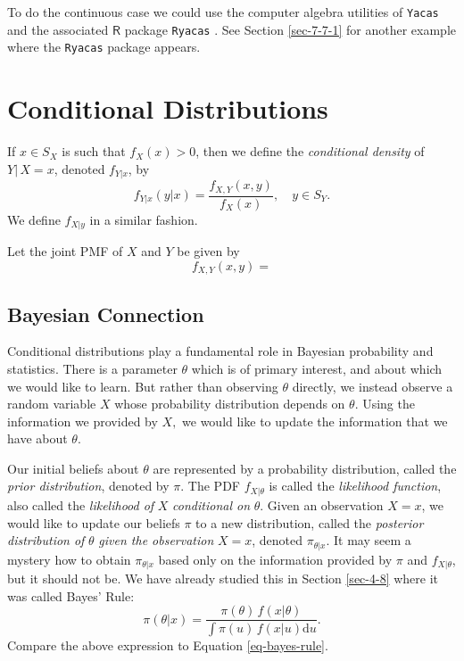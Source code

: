 To do the continuous case we could use the computer algebra utilities
of \texttt{Yacas} and the associated \(\mathsf{R}\) package \texttt{Ryacas}
\cite{Ryacas}. See Section \ref{sec-7-7-1} for another example
where the \texttt{Ryacas} package appears.

\section{Conditional Distributions}
\label{sec-7-3}

If \(x\in S_{X}\) is such that \(f_{X}(x)>0\), then we define the
\emph{conditional density} of \(Y|\, X=x\), denoted \(f_{Y|x}\), by
\begin{equation}
f_{Y|x}(y|x)=\frac{f_{X,Y}(x,y)}{f_{X}(x)},\quad y\in S_{Y}.
\end{equation}
We define \(f_{X|y}\) in a similar fashion.


Let the joint PMF of \(X\) and \(Y\) be given by
\[
f_{X,Y}(x,y) =
\]

\subsection{Bayesian Connection}
\label{sec-7-3-1}

Conditional distributions play a fundamental role in Bayesian
probability and statistics. There is a parameter \(\theta\) which is
of primary interest, and about which we would like to learn. But
rather than observing \(\theta\) directly, we instead observe a random
variable \(X\) whose probability distribution depends on
\(\theta\). Using the information we provided by \(X,\) we would like
to update the information that we have about \(\theta\).

Our initial beliefs about \(\theta\) are represented by a probability
distribution, called the \emph{prior distribution}, denoted by \(\pi\). The
PDF \(f_{X|\theta}\) is called the \emph{likelihood function}, also called
the \emph{likelihood of} \(X\) \emph{conditional on} \(\theta\). Given an
observation \(X=x\), we would like to update our beliefs \(\pi\) to a
new distribution, called the \emph{posterior distribution of} \(\theta\)
\emph{given the observation} \(X=x\), denoted \(\pi_{\theta|x}\). It may
seem a mystery how to obtain \(\pi_{\theta|x}\) based only on the
information provided by \(\pi\) and \(f_{X|\theta}\), but it should
not be. We have already studied this in Section \ref{sec-4-8} where it
was called Bayes' Rule:
\begin{equation} 
\pi(\theta|x)=\frac{\pi(\theta)\, f(x|\theta)}{\int\pi(u)\, f(x|u)\mathrm{d} u}.
\end{equation} 
Compare the above expression to Equation \eqref{eq-bayes-rule}.



